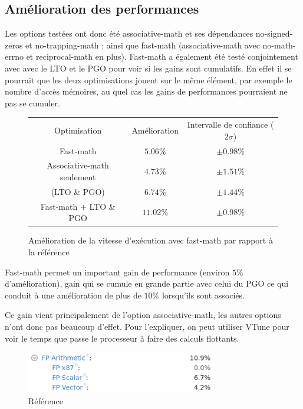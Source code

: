 \documentclass[a4paper,11pt]{report}
\begin{document}
\subsection{Amélioration des performances}
Les options testées ont donc été associative-math et ses dépendances no-signed-zeros et no-trapping-math ;
ainsi que fast-math (associative-math avec no-math-errno et reciprocal-math en plus).
Fast-math a également été testé conjointement avec avec le LTO et le PGO pour voir si les gains sont cumulatifs.
En effet il se pourrait que les deux optimisations jouent sur le même élément, par exemple le nombre d'accès mémoires, au quel cas les gains de performances pourraient ne pas se cumuler.
\begin{figure}[H]
    \begin{center}
        \begin{tabular}{ c c c }
            Optimisation               & Amélioration & Intervalle de confiance ($2\sigma$) \\
            Fast-math                  & $5.06\%$     & $\pm 0.98\%$                        \\
            Associative-math seulement & $4.73\%$     & $\pm 1.51\%$                        \\
            (LTO \& PGO)               & $6.74\%$     & $\pm 1.44\%$                        \\
            Fast-math + LTO \& PGO     & $11.02\%$    & $\pm 0.98\%$
        \end{tabular}
    \end{center}
    \caption{Amélioration de la vitesse d'exécution avec fast-math par rapport à la référence}
    \label{results_fast-math}
\end{figure}

Fast-math permet un important gain de performance (environ $5\%$ d'amélioration),
gain qui se cumule en grande partie avec celui du PGO ce qui conduit à une amélioration de plus de $10\%$ lorsqu'ils sont associés.

Ce gain vient principalement de l'option associative-math, les autres options n'ont donc pas beaucoup d'effet.
Pour l'expliquer, on peut utiliser VTune pour voir le temps que passe le processeur à faire des calculs flottants.

\begin{figure}[H]
    \includegraphics[width=0.75\textwidth, center]{reference_vtune.png}
    \caption{Référence}
    \label{reference_vtune}
\end{figure}
\end{document}
